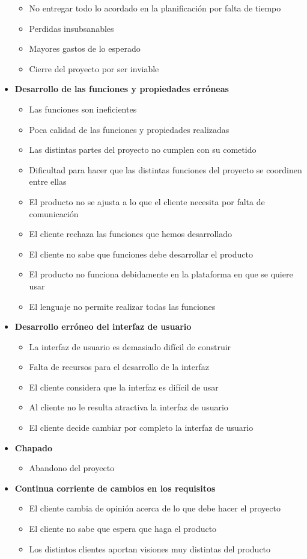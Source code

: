 \documentclass[spanish,a4paper,12pt]{report}	%
\begin{document}
\begin{itemize}
\begin{itemize}
		\item {No entregar todo lo acordado en la planificación por falta de tiempo}
		\item {Perdidas insubsanables}
		\item {Mayores gastos de lo esperado}
		\item {Cierre del proyecto por ser inviable}
	\end{itemize}
\item \textbf {Desarrollo de las funciones y propiedades erróneas}
	\begin{itemize}
		\item {Las funciones son ineficientes}
		\item {Poca calidad de las funciones y propiedades realizadas}
		\item {Las distintas partes del proyecto no cumplen con su cometido}
		\item {Dificultad para hacer que las distintas funciones del proyecto se coordinen entre ellas}
		\item {El producto no se ajusta a lo que el cliente necesita por falta de comunicación}
		\item {El cliente rechaza las funciones que hemos desarrollado}
		\item {El cliente no sabe que funciones debe desarrollar el producto}
		\item {El producto no funciona debidamente en la plataforma en que se quiere usar}
		\item {El lenguaje no permite realizar todas las funciones}
	\end{itemize}
\item \textbf {Desarrollo erróneo del interfaz de usuario}
	\begin{itemize}
		\item {La interfaz de usuario es demasiado difícil de construir}
		\item {Falta de recursos para el desarrollo de la interfaz}
		\item {El cliente considera que la interfaz es difícil de usar}
		\item {Al cliente no le resulta atractiva la interfaz de usuario}
		\item {El cliente decide cambiar por completo la interfaz de usuario}
	\end{itemize}
\item \textbf {Chapado}
	\begin{itemize}
		\item {Abandono del proyecto}
	\end{itemize}
\item \textbf {Continua corriente de cambios en los requisitos}
	\begin{itemize}
		\item {El cliente cambia de opinión acerca de lo que debe hacer el proyecto}
		\item {El cliente no sabe que espera que haga el producto}
		\item {Los distintos clientes aportan visiones muy distintas del producto}


\end{itemize}
\end{itemize}
\end{document}
